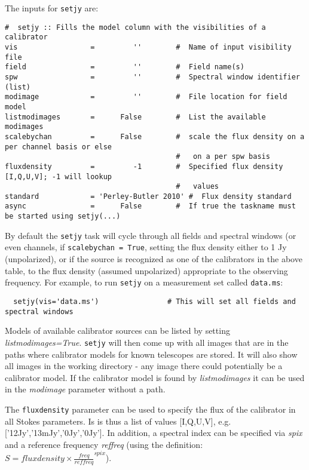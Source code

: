 The inputs for {\tt setjy} are:
\small
\begin{verbatim}
#  setjy :: Fills the model column with the visibilities of a calibrator
vis                 =         ''        #  Name of input visibility file
field               =         ''        #  Field name(s)
spw                 =         ''        #  Spectral window identifier (list)
modimage            =         ''        #  File location for field model
listmodimages       =      False        #  List the available modimages
scalebychan         =      False        #  scale the flux density on a per channel basis or else
                                        #   on a per spw basis
fluxdensity         =         -1        #  Specified flux density [I,Q,U,V]; -1 will lookup
                                        #   values
standard            = 'Perley-Butler 2010' #  Flux density standard
async               =      False        #  If true the taskname must be started using setjy(...)

\end{verbatim}
\normalsize By default the {\tt setjy} task will cycle through all
fields and spectral windows (or even channels, if {\tt scalebychan =
  True}, setting the flux density either to 1 Jy (unpolarized), or if
the source is recognized as one of the calibrators in the above table,
to the flux density (assumed unpolarized) appropriate to the observing
frequency.  For example, to run {\tt setjy} on a measurement set
called {\tt data.ms}: \small
\begin{verbatim}
  setjy(vis='data.ms')                # This will set all fields and spectral windows
\end{verbatim}
\normalsize

Models of available calibrator sources can be listed by setting {\it
  listmodimages=True}. {\tt setjy} will then come up with all images
that are in the paths where calibrator models for known telescopes are
stored. It will also show all images in the working directory - any
image there could potentially be a calibrator model. If the calibrator
model is found by {\it listmodimages} it can be used in the {\it
  modimage} parameter without a path.

The {\tt fluxdensity} parameter can be used to specify the flux of the
calibrator in all Stokes parameters. Is is thus a list of values
[I,Q,U,V], e.g. ['12Jy','13mJy','0Jy','0Jy']. In addition, a spectral
index can be specified via {\it spix} and a reference frequency {\it
  reffreq} (using the definition: $S = fluxdensity\times\frac{
  freq}{reffreq}^{spix}$).


